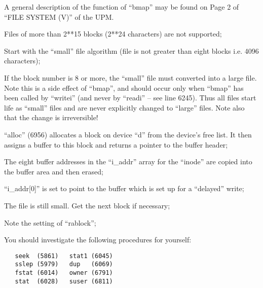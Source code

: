 A general description of the function
of ``bmap'' may be found on Page 2 of
``FILE SYSTEM (V)'' of the UPM.

\bd
\item[6423:] Files of more than 2**15 blocks
 (2**24 characters) are not supported;

\item[6427:] Start with the ``small'' file algorithm (file is not greater than
 eight blocks i.e. 4096 characters);

\item[6431:] If the block number is 8 or more,
the ``small'' file must converted
into a large file. Note this is
a side effect of ``bmap'', and
should occur only when ``bmap'' has
been called by ``writei'' (and
never by ``readi'' -- see line
6245). Thus all files start life
as ``small'' files and are never
explicitly changed to ``large''
files. Note also that the change
is irreversible!

\item[6435:] ``alloc'' (6956) allocates a block
on device ``d'' from the device's
free list. It then assigns a
buffer to this block and returns
a pointer to the buffer header;

\item[6438:] The eight buffer addresses in the
``i\_addr'' array for the ``inode''
are copied into the buffer area
and then erased;

\item[6442:] ``i\_addr[0]'' is set to point to
 the buffer which is set up for a
 ``delayed'' write;

\item[6448:] The file is still small. Get the
next block if necessary;

\item[6456:] Note the setting of ``rablock'';
\ed


You should investigate the following
procedures for yourself:

\begin{verbatim}
   seek  (5861)   stat1 (6045)
   sslep (5979)   dup   (6069)
   fstat (6014)   owner (6791)
   stat  (6028)   suser (6811)
\end{verbatim}
